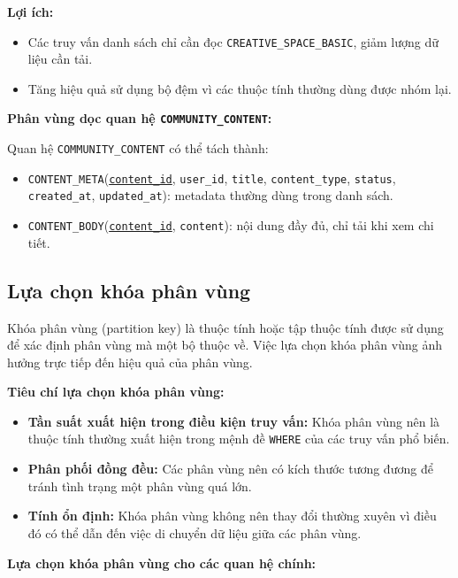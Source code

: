 \textbf{Lợi ích:}
\begin{itemize}
    \item Các truy vấn danh sách chỉ cần đọc \texttt{CREATIVE\_SPACE\_BASIC}, giảm lượng dữ liệu cần tải.
    \item Tăng hiệu quả sử dụng bộ đệm vì các thuộc tính thường dùng được nhóm lại.
\end{itemize}

\textbf{Phân vùng dọc quan hệ \texttt{COMMUNITY\_CONTENT}:}

Quan hệ \texttt{COMMUNITY\_CONTENT} có thể tách thành:

\begin{itemize}
    \item \texttt{CONTENT\_META}(\underline{\texttt{content\_id}}, \texttt{user\_id}, \texttt{title}, \texttt{content\_type}, \texttt{status}, \texttt{created\_at}, \texttt{updated\_at}): metadata thường dùng trong danh sách.
    \item \texttt{CONTENT\_BODY}(\underline{\texttt{content\_id}}, \texttt{content}): nội dung đầy đủ, chỉ tải khi xem chi tiết.
\end{itemize}

\subsection{Lựa chọn khóa phân vùng}

Khóa phân vùng (partition key) là thuộc tính hoặc tập thuộc tính được sử dụng để xác định phân vùng mà một bộ thuộc về. Việc lựa chọn khóa phân vùng ảnh hưởng trực tiếp đến hiệu quả của phân vùng.

\textbf{Tiêu chí lựa chọn khóa phân vùng:}

\begin{itemize}
    \item \textbf{Tần suất xuất hiện trong điều kiện truy vấn:} Khóa phân vùng nên là thuộc tính thường xuất hiện trong mệnh đề \texttt{WHERE} của các truy vấn phổ biến.
    \item \textbf{Phân phối đồng đều:} Các phân vùng nên có kích thước tương đương để tránh tình trạng một phân vùng quá lớn.
    \item \textbf{Tính ổn định:} Khóa phân vùng không nên thay đổi thường xuyên vì điều đó có thể dẫn đến việc di chuyển dữ liệu giữa các phân vùng.
\end{itemize}

\textbf{Lựa chọn khóa phân vùng cho các quan hệ chính:}

